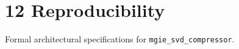 \section{12 Reproducibility}

Formal architectural specifications for \texttt{mgie_svd_compressor}.
